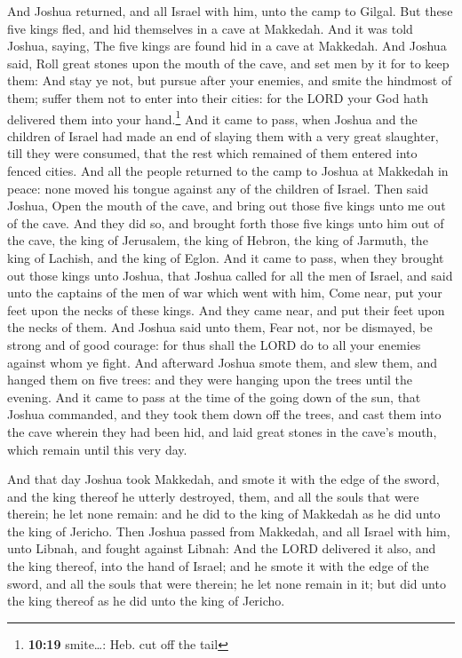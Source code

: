  And Joshua returned, and all Israel with him, unto the
camp to Gilgal.  But these five kings fled, and hid
themselves in a cave at Makkedah.  And it was told
Joshua, saying, The five kings are found hid in a cave at Makkedah.
 And Joshua said, Roll great stones upon the mouth of the
cave, and set men by it for to keep them:  And stay ye
not, but pursue after your enemies, and smite the hindmost of them;
suffer them not to enter into their cities: for the LORD your God hath
delivered them into your hand.\footnote{\textbf{10:19} smite\ldots: Heb.
  cut off the tail}  And it came to pass, when Joshua and
the children of Israel had made an end of slaying them with a very great
slaughter, till they were consumed, that the rest which remained of them
entered into fenced cities.  And all the people returned
to the camp to Joshua at Makkedah in peace: none moved his tongue
against any of the children of Israel.  Then said Joshua,
Open the mouth of the cave, and bring out those five kings unto me out
of the cave.  And they did so, and brought forth those
five kings unto him out of the cave, the king of Jerusalem, the king of
Hebron, the king of Jarmuth, the king of Lachish, and the king of Eglon.
 And it came to pass, when they brought out those kings
unto Joshua, that Joshua called for all the men of Israel, and said unto
the captains of the men of war which went with him, Come near, put your
feet upon the necks of these kings. And they came near, and put their
feet upon the necks of them.  And Joshua said unto them,
Fear not, nor be dismayed, be strong and of good courage: for thus shall
the LORD do to all your enemies against whom ye fight. 
And afterward Joshua smote them, and slew them, and hanged them on five
trees: and they were hanging upon the trees until the evening.
 And it came to pass at the time of the going down of the
sun, that Joshua commanded, and they took them down off the trees, and
cast them into the cave wherein they had been hid, and laid great stones
in the cave's mouth, which remain until this very day.

 And that day Joshua took Makkedah, and smote it with the
edge of the sword, and the king thereof he utterly destroyed, them, and
all the souls that were therein; he let none remain: and he did to the
king of Makkedah as he did unto the king of Jericho. 
Then Joshua passed from Makkedah, and all Israel with him, unto Libnah,
and fought against Libnah:  And the LORD delivered it
also, and the king thereof, into the hand of Israel; and he smote it
with the edge of the sword, and all the souls that were therein; he let
none remain in it; but did unto the king thereof as he did unto the king
of Jericho.

